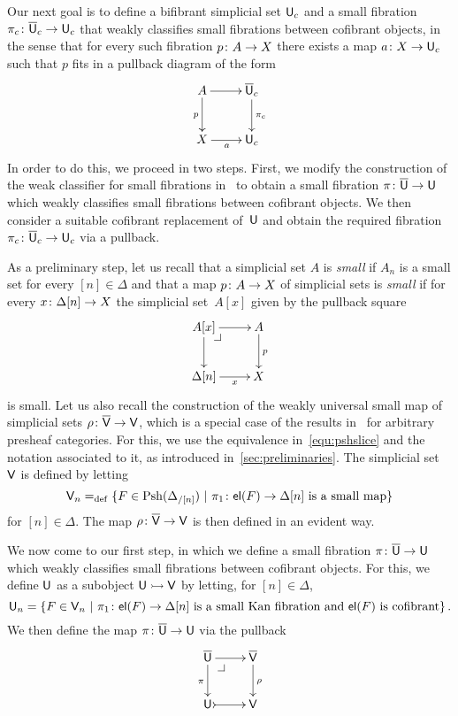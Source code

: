 \documentclass[reqno,10pt,a4paper,oneside,draft]{amsart}
\begin{document}
Our next goal is to define a bifibrant simplicial set $\mathsf{U}_c$ and a small fibration $\pi_c \colon \overline{\mathsf{U}}_c \to \mathsf{U}_c$ that weakly classifies small fibrations between cofibrant objects, in the sense that for every such fibration $p \colon A \to X$ there exists a map $a \colon X \to \mathsf{U}_c$ such that $p$ fits in a pullback diagram of the form
\[
\xymatrix{
A \ar[r] \ar[d]_p   & \UU_c \ar[d]^{\pi_c} \\
X \ar[r]_a &  \U_c }
\]
In order to do this, we proceed in two steps. First, we modify  the construction of the weak classifier for small fibrations in~\cite{voevodsky-simplicial-model} to obtain a small fibration $\pi \colon \overline{\mathsf{U}} \to \mathsf{U}$ which weakly classifies  small fibrations between cofibrant objects. We then consider a suitable cofibrant replacement 
of~$\mathsf{U}$ and obtain the required fibration $\pi_c \colon \overline{\mathsf{U}}_c \to \mathsf{U}_c$ via a 
pullback. 

\medskip

As a preliminary step, let us recall that a simplicial set $A$ is \emph{small}  if $A_n$ is a small set for every $[n] \in \Delta$ and that a map $p \colon A \to X$ of simplicial sets is \emph{small} if for every $x \colon \Delta[n] 
\to X$ the simplicial set~$A[x]$ given by the pullback square
\[
\xymatrix{
A[x] \ar[r] \ar[d] \drpullback & A \ar[d]^{p} \\
\Delta[n] \ar[r]_-{x} & X }
\]
is small. Let us also recall the  construction of the weakly universal small map of simplicial sets $\rho \colon \overline{\mathsf{V}} \to \mathsf{V}$, which is a special case of the results in~\cite{hofmann-streicher-universes} for arbitrary presheaf categories.  For this, we use the equivalence in~\eqref{equ:pshslice} and the notation associated to it, as introduced
in~\cref{sec:preliminaries}. 
The simplicial set $\mathsf{V}$ is defined by letting
\[
\mathsf{V}_n =_{\operatorname{def}} \{ F \in \mathrm{Psh}(\Delta_{/[n]}) \ | \ \pi_1 \colon \mathsf{el}(F) \to \Delta[n] \text{ is a small
map} \}
\]
for $[n] \in \Delta$. The map $\rho \colon \overline{\mathsf{V}} \to \mathsf{V}$ is then defined in an evident way. 


\bigskip

We now come to our first step, in which we define a small fibration $\pi \colon \overline{\mathsf{U}} \to \mathsf{U}$ which weakly classifies  small fibrations between cofibrant objects. For this, we define $\mathsf{U}$ as a subobject $\mathsf{U} \rightarrowtail \mathsf{V}$ by letting, for $[n] \in \Delta$, 
\[
\mathsf{U}_n = \{ F \in \mathsf{V}_n \ | \ \pi_1 \colon \mathsf{el}(F) \to \Delta[n] \text{ is a small Kan fibration and $\mathsf{el}(F)$ is cofibrant} \} \, .
\]
We then define the map $\pi \colon \overline{\mathsf{U}} \to \mathsf{U}$ via the pullback 
\[
\xymatrix{
\UU \ar[r] \ar[d]_\pi \drpullback  & \VV \ar[d]^\rho \\
\U \ar@{>->}[r] & \V }
\]
\end{document}
